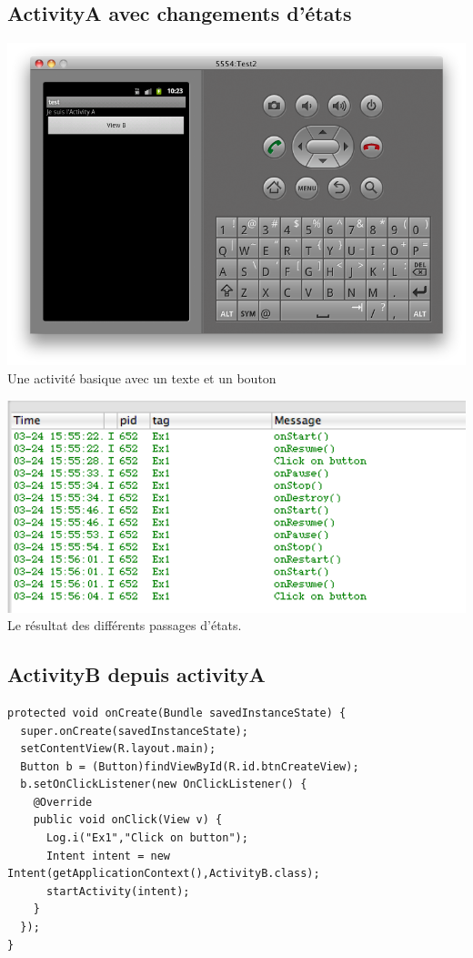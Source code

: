 		\subsection{ActivityA avec changements d'états}
		
		\begin{center}
			\includegraphics[width=1\textwidth]{./images/ex1a.png}
			Une activité basique avec un texte et un bouton
		\end{center}		
		
		\begin{center}
			\includegraphics[width=1\textwidth]{./images/ex1.png}
			Le résultat des différents passages d'états.
		\end{center}	
		\subsection{ActivityB depuis activityA}
\begin{lstlisting}
protected void onCreate(Bundle savedInstanceState) {
  super.onCreate(savedInstanceState);
  setContentView(R.layout.main);
  Button b = (Button)findViewById(R.id.btnCreateView);
  b.setOnClickListener(new OnClickListener() {
    @Override
    public void onClick(View v) {
      Log.i("Ex1","Click on button");
      Intent intent = new Intent(getApplicationContext(),ActivityB.class);
      startActivity(intent);
    }
  });
}
\end{lstlisting}

